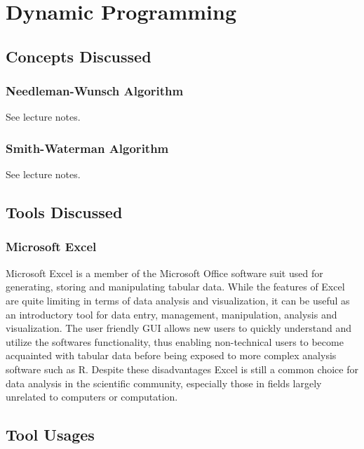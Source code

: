 \chapter{Dynamic Programming} 

\label{Chapter2} 

\section{Concepts Discussed}

        \subsection{Needleman-Wunsch Algorithm}
        See lecture notes.\autocite{T2}
        \subsection{Smith-Waterman Algorithm}
        See lecture notes.\autocite{T2}

\section{Tools Discussed}

    \subsection{Microsoft Excel}

    Microsoft Excel is a member of the Microsoft Office software suit used for generating, storing and manipulating tabular data.\autocite{B3} While the features of Excel are quite limiting in terms of data analysis and visualization, it can be useful as an introductory tool for data entry, management, manipulation, analysis and visualization. The user friendly GUI allows new users to quickly understand and utilize the softwares functionality, thus enabling non-technical users to become acquainted with tabular data before being exposed to more complex analysis software such as R.\autocite{B3} Despite these disadvantages Excel is still a common choice for data analysis in the scientific community, especially those in fields largely unrelated to computers or computation. 

\section{Tool Usages}

